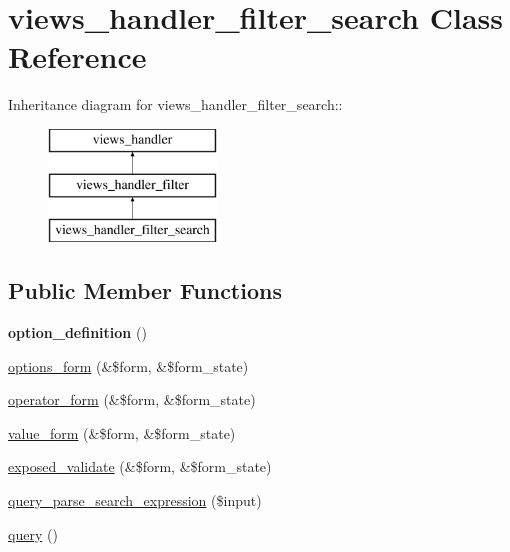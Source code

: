 \hypertarget{classviews__handler__filter__search}{
\section{views\_\-handler\_\-filter\_\-search Class Reference}
\label{classviews__handler__filter__search}
}
Inheritance diagram for views\_\-handler\_\-filter\_\-search::\begin{figure}[H]
\begin{center}
\leavevmode
\includegraphics[height=3cm]{classviews__handler__filter__search}
\end{center}
\end{figure}
\subsection*{Public Member Functions}
\begin{DoxyCompactItemize}
\item 
\hypertarget{classviews__handler__filter__search_af41b61b9dc7a676fbe0110c1d7ffcfdb}{
{\bfseries option\_\-definition} ()}
\label{classviews__handler__filter__search_af41b61b9dc7a676fbe0110c1d7ffcfdb}

\item 
\hyperlink{classviews__handler__filter__search_ada5367d9347c96ba96de10ed22ab7ea0}{options\_\-form} (\&\$form, \&\$form\_\-state)
\item 
\hyperlink{classviews__handler__filter__search_a126abdcf04c59fd3e4be404ffd9969cf}{operator\_\-form} (\&\$form, \&\$form\_\-state)
\item 
\hyperlink{classviews__handler__filter__search_a60e1cc17477e80f07c703ae29348b329}{value\_\-form} (\&\$form, \&\$form\_\-state)
\item 
\hyperlink{classviews__handler__filter__search_a4cdb0b399fcbd1e4a5643924b706dddd}{exposed\_\-validate} (\&\$form, \&\$form\_\-state)
\item 
\hyperlink{classviews__handler__filter__search_a9904194e766321793c3b75f57526547b}{query\_\-parse\_\-search\_\-expression} (\$input)
\item 
\hyperlink{classviews__handler__filter__search_af972f15bdc716b36d04d9a9d4f20b6f5}{query} ()
\end{DoxyCompactItemize}
